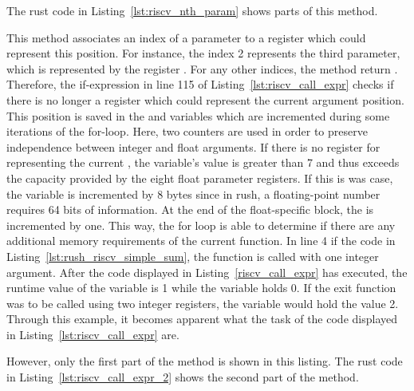 The rust code in Listing~\ref{lst:riscv_nth_param} shows parts of this method.


This method associates an index of a parameter to a register which could represent this position.
For instance, the index 2 represents the third parameter, which is represented by the register .
For any other indices, the method return .
Therefore, the if-expression in line 115 of Listing~\ref{lst:riscv_call_expr} checks if there is no longer a register which could represent the current argument position.
This position is saved in the  and  variables which are incremented during some iterations of the for-loop.
Here, two counters are used in order to preserve independence between integer and float arguments.
If there is no register for representing the current , the variable's value is greater than 7 and thus exceeds the capacity provided by the eight float parameter registers.
If this is was case, the  variable is incremented by 8 bytes since in rush, a floating-point number requires 64 bits of information.
At the end of the float-specific block, the  is incremented by one.
This way, the for loop is able to determine if there are any additional memory requirements of the current function.
In line 4 if the code in Listing~\ref{lst:rush_riscv_simple_sum}, the  function is called with one integer argument.
After the code displayed in Listing~\ref{riscv_call_expr} has executed,
the runtime value of the  variable is 1 while the  variable holds 0.
If the exit function was to be called using two integer registers, the  variable would hold the value 2.
Through this example, it becomes apparent what the task of the code displayed in Listing~\ref{lst:riscv_call_expr} are.

However, only the first part of the  method is shown in this listing.
The rust code in Listing~\ref{lst:riscv_call_expr_2} shows the second part of the method.


